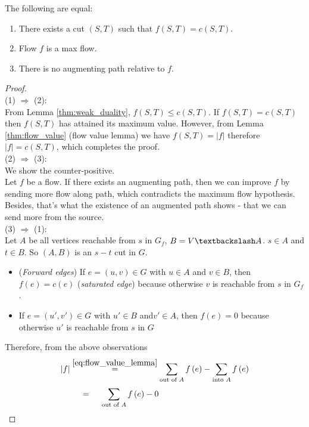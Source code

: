 \documentclass[a4paper]{article}
\begin{document}
\begin{theorem}
The following are equal:
\begin{enumerate}
    \item There exists a cut $(S, T)$ such that $f(S,T) = c(S, T)$.
    \item Flow $f$ is a max flow.
    \item There is no augmenting path relative to $f$.
\end{enumerate}
\end{theorem}
\begin{proof}\quad \\
(1) $\Rightarrow$ (2):\\
From Lemma \ref{thm:weak_duality}, $f(S,T)\leq c(S,T)$. If $f(S,T)= c(S,T)$ then $f(S,T)$ has attained its maximum value. However, from Lemma \ref{thm:flow_value} (flow value lemma) we have $f(S,T)=\left|f \right|$ therefore $\left| f\right |=c(S,T)$, which completes the proof.\\
(2) $\Rightarrow$ (3): \\
We show the counter-positive.\\
Let $f$ be a flow. If there exists an augmenting path, then we can improve $f$ by sending more flow along path, which contradicts the maximum flow hypothesis. Besides, that's what the existence of an augmented path shows - that we can send more from the source.\\
(3) $\Rightarrow$ (1):\\
Let $A$ be all vertices reachable from $s$ in $G_f$, $B = V \textbackslash A$. $s \in A$ and $t \in B$. So $(A, B)$ is an $s-t$ cut in $G$.
\begin{itemize}
    \item (\textit{Forward edges}) If $e = (u, v) \in G$ with $u \in A $ and $v \in B$, then $f (e) = c(e)$ (\textit{saturated edge}) because otherwise $v$ is reachable from $s$ in $G_f$.
    \item If $ e = (u', v') \in G$ with $u' \in B$ and$ v' \in A$, then $f (e) = 0$ because otherwise $u' $ is reachable from $s$ in $G$
\end{itemize}
Therefore, from the above observations
\[
\begin{split}
    \left|f \right|
    & \overeq{\eqref{eq:flow_value_lemma}} 
    \sum\limits_{\text{out of }A}{f\left( e \right)}-\sum\limits_{\text{into }A}{f\left( e \right)}\\
    &\overeq{\textcolor{white}{Eq.\ (1.8)}}\sum\limits_{\text{out of }A}{f\left( e \right)}-0\\

\end{split}\]
\end{proof}
\end{document}
